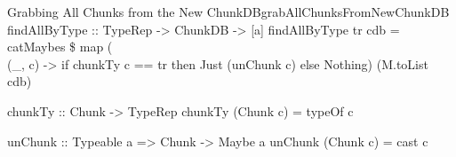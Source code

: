 \begin{pseudohaskell}{Grabbing All Chunks from the New ChunkDB}{grabAllChunksFromNewChunkDB}
findAllByType :: TypeRep -> ChunkDB -> [a]
findAllByType tr cdb = catMaybes \$ map (\\(_, c) -> if chunkTy c == tr then Just (unChunk c) else Nothing) (M.toList cdb)

chunkTy :: Chunk -> TypeRep
chunkTy (Chunk c) = typeOf c

unChunk :: Typeable a => Chunk -> Maybe a
unChunk (Chunk c) = cast c
\end{pseudohaskell}
